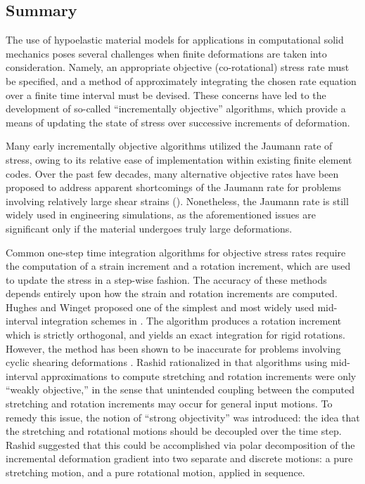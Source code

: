 \subsection{Summary}

The use of hypoelastic material models for applications in computational solid mechanics poses several challenges when finite deformations are taken into consideration. Namely, an appropriate objective (co-rotational) stress rate must be specified, and a method of approximately integrating the chosen rate equation over a finite time interval must be devised. These concerns have led to the development of so-called ``incrementally objective'' algorithms, which provide a means of updating the state of stress over successive increments of deformation.

Many early incrementally objective algorithms utilized the Jaumann rate of stress, owing to its relative ease of implementation within existing finite element codes. Over the past few decades, many alternative objective rates have been proposed to address apparent shortcomings of the Jaumann rate for problems involving relatively large shear strains (\cite{dienes1979}). Nonetheless, the Jaumann rate is still widely used in engineering simulations, as the aforementioned issues are significant only if the material undergoes truly large deformations.

Common one-step time integration algorithms for objective stress rates require the computation of a strain increment and a rotation increment, which are used to update the stress in a step-wise fashion. The accuracy of these methods depends entirely upon how the strain and rotation increments are computed. Hughes and Winget proposed one of the simplest and most widely used mid-interval integration schemes in \cite{hughes1980}. The algorithm produces a rotation increment which is strictly orthogonal, and yields an exact integration for rigid rotations. However, the method has been shown to be inaccurate for problems involving cyclic shearing deformations \cite{rashid1996}. Rashid rationalized in \cite{rashid1993} that algorithms using mid-interval approximations to compute stretching and rotation increments were only ``weakly objective,'' in the sense that unintended coupling between the computed stretching and rotation increments may occur for general input motions. To remedy this issue, the notion of ``strong objectivity'' was introduced: the idea that the stretching and rotational motions should be decoupled over the time step. Rashid suggested that this could be accomplished via polar decomposition of the incremental deformation gradient into two separate and discrete motions: a pure stretching motion, and a pure rotational motion, applied in sequence.

